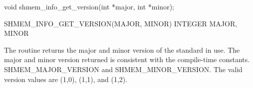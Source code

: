 \synC   %

void shmem_info_get_version(int *major, int *minor); %

\synF   %

SHMEM_INFO_GET_VERSION(MAJOR, MINOR)   
INTEGER MAJOR, MINOR %

{
  The routine returns the major and minor version of the \openshmem{} standard in use.
  The major and minor version returned is consistent with the compile-time
  constants.
  \newline
  SHMEM\_MAJOR\_VERSION and SHMEM\_MINOR\_VERSION. 
  The valid version values are (1,0), (1,1), and (1,2).
}
{
}
\eAPI

